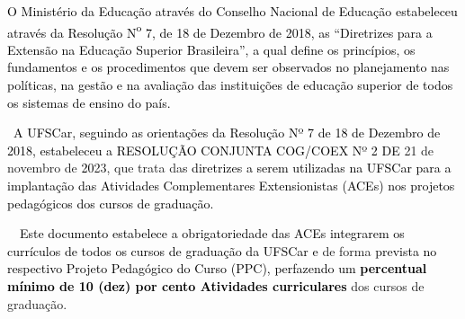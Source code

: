 




%
 




\bigskip

\textcolor{black}{O Ministério da Educação através do Conselho Nacional de Educação estabeleceu através da Resolução
N}\textcolor{black}{\textsuperscript{o}}\textcolor{black}{ 7, de 18 de Dezembro de 2018, as “Diretrizes para a Extensão
na Educação Superior Brasileira”, a qual define os princípios, os fundamentos e os procedimentos que devem ser
observados no planejamento nas políticas, na gestão e na avaliação das instituições de educação superior de todos os
sistemas de ensino do país.}


\textcolor{black}{\ A UFSCar, seguindo as orientações da Resolução Nº 7 de 18 de Dezembro de 2018, estabeleceu a
RESOLUÇÃO CONJUNTA COG/COEX Nº 2 DE }21 de novembro de \textcolor{black} { 20}23, que trata da\textcolor{black}{s
diretrizes a serem utilizadas na UFSCar para a implantação das Atividades Complementares Extensionistas (ACEs)}
\textcolor{black}{nos projetos pedagógicos dos cursos de graduação.}

\textcolor{black}{\ \ Este documento estabelece a obrigatoriedade das ACEs integrarem os currículos de todos os cursos
de graduação da UFSCar e }de forma\textcolor{black}{ prevista no respectivo Projeto Pedagógico do Curso (PPC),
perfazendo um }\textbf{\textcolor{black}{percentual mínimo de 10 (dez) por cento Atividades curriculares}} dos cursos de
graduação.\textcolor{black}{ }


